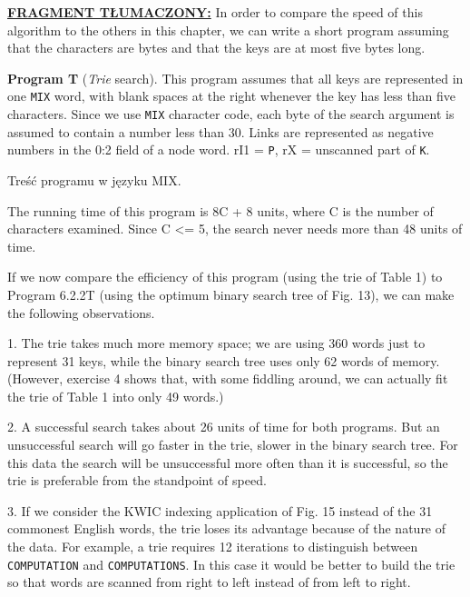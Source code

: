 	\ifsourcematerial
	\begin{displayquote}
		\color{ao(english)}
		\underline{\textbf{FRAGMENT TŁUMACZONY:}} \newline
		In order to compare the speed of this algorithm to the others in this chapter, we can write a short program assuming that the characters are bytes and that the keys are at most five bytes long. \newline
		
		\textbf{Program T} (\emph{Trie} search). This program assumes that all keys are represented in one \texttt{MIX} word, with blank spaces at the right whenever the key has less than five characters. Since we use \texttt{MIX} character code, each byte of the search argument is assumed to contain a number less than 30. Links are represented as negative numbers in the 0:2 field of a node word. rI1 = \texttt{P}, rX = unscanned part of \texttt{K}.
		
		\elide Treść programu w języku MIX. \elide
		
		The running time of this program is 8C + 8 units, where C is the number of
		characters examined. Since C <= 5, the search never needs more than 48 units of 
		time.
		
		If we now compare the efficiency of this program (using the trie of Table 1)
		to Program 6.2.2T (using the optimum binary search tree of Fig. 13), we can
		make the following observations.
		
		1. The trie takes much more memory space; we are using 360 words just to
		represent 31 keys, while the binary search tree uses only 62 words of memory.
		(However, exercise 4 shows that, with some fiddling around, we can actually fit
		the trie of Table 1 into only 49 words.)
		
		2. A successful search takes about 26 units of time for both programs. But an
		unsuccessful search will go faster in the trie, slower in the binary search tree. For
		this data the search will be unsuccessful more often than it is successful, so the
		trie is preferable from the standpoint of speed.
		
		3. If we consider the KWIC indexing application of Fig. 15 instead of the 31
		commonest English words, the trie loses its advantage because of the nature of
		the data. For example, a trie requires 12 iterations to distinguish between \texttt{COMPUTATION} and \texttt{COMPUTATIONS}. In this case it would be better to build the trie so that words are scanned from right to left instead of from left to right.
	\end{displayquote}
	\fi
	
